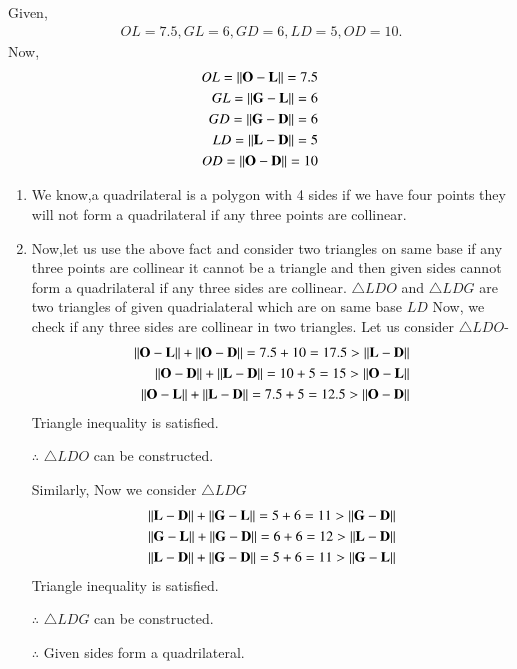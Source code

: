 \documentclass[journal,12pt,twocolumn]{IEEEtran}
\begin{document}
Given,
\begin{align}
\ OL = 7.5, GL = 6, GD = 6, LD = 5, OD = 10 .
\end{align}
Now,
\begin{align}
OL=\left\lVert\mathbf{O}-\mathbf{L}\right\rVert = 7.5
 \\
GL=\left\lVert\mathbf{G}-\mathbf{L}\right\rVert = 6
 \\
GD=\left\lVert\mathbf{G}-\mathbf{D}\right\rVert = 6
 \\
LD=\left\lVert\mathbf{L}-\mathbf{D}\right\rVert = 5
 \\
OD=\left\lVert\mathbf{O}-\mathbf{D}\right\rVert = 10
\end{align}
\begin{enumerate}
\item We know,a quadrilateral is a polygon with 4 sides if we have four points they will not form a quadrilateral if any three points are collinear. 
\item Now,let us use the above fact and consider two triangles on same base if any three points are collinear it cannot be a triangle and then given sides cannot form a quadrilateral if any three sides are collinear.
$\triangle LDO$ and $\triangle LDG$ are two triangles of given quadrialateral which are on same base $LD$ 
Now, we check if any three sides are collinear in two triangles.
Let us consider $\triangle LDO$-
\begin{align}
\left\lVert\mathbf{O}-\mathbf{L}\right\rVert + \left\lVert\mathbf{O}-\mathbf{D}\right\rVert = 7.5 + 10 =17.5 > \left\lVert\mathbf{L}-\mathbf{D}\right\rVert
\\
\left\lVert\mathbf{O}-\mathbf{D}\right\rVert + \left\lVert\mathbf{L}-\mathbf{D}\right\rVert = 10 + 5 =15 > \left\lVert\mathbf{O}-\mathbf{L}\right\rVert
\\
\left\lVert\mathbf{O}-\mathbf{L}\right\rVert + \left\lVert\mathbf{L}-\mathbf{D}\right\rVert = 7.5 + 5 =12.5 > \left\lVert\mathbf{O}-\mathbf{D}\right\rVert
\end{align}
Triangle inequality is satisfied.

$\therefore$ $\triangle LDO$ can be constructed.

Similarly, Now we consider $\triangle LDG$
\begin{align}
\left\lVert\mathbf{L}-\mathbf{D}\right\rVert + \left\lVert\mathbf{G}-\mathbf{L}\right\rVert = 5 + 6 =11 > \left\lVert\mathbf{G}-\mathbf{D}\right\rVert
\\
\left\lVert\mathbf{G}-\mathbf{L}\right\rVert + \left\lVert\mathbf{G}-\mathbf{D}\right\rVert = 6 + 6 =12 > \left\lVert\mathbf{L}-\mathbf{D}\right\rVert
\\
\left\lVert\mathbf{L}-\mathbf{D}\right\rVert + \left\lVert\mathbf{G}-\mathbf{D}\right\rVert = 5 + 6 =11 > \left\lVert\mathbf{G}-\mathbf{L}\right\rVert
\end{align}
Triangle inequality is satisfied.

$\therefore$ $\triangle LDG$ can be constructed.

$\therefore$ Given sides form a quadrilateral.


\end{enumerate}
\end{document}
